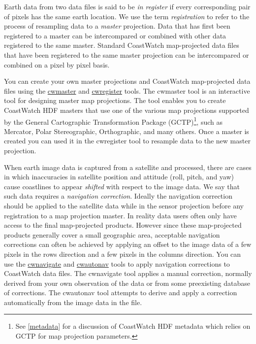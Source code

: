 Earth data from two data files is said to be {\em in register} if
every corresponding pair of pixels has the same earth location.  We
use the term {\em registration} to refer to the process of resampling
data to a {\em master} projection.  Data that has first been
registered to a master can be intercompared or combined with
other data registered to the same master.  Standard CoastWatch
map-projected data files that have been registered to the same master
projection can be intercompared or combined on a pixel by pixel basis.

You can create your own master projections and CoastWatch map-projected
data files using the \hyperlink{cwmaster}{cwmaster} and
\hyperlink{cwregister}{cwregister} tools.  The cwmaster tool is an
interactive tool for designing master map projections.  The tool
enables you to create CoastWatch HDF masters that use one of the
various map projections supported by the General Cartographic
Transformation Package (GCTP)\footnote{See \autoref{metadata} for
a discussion of CoastWatch HDF metadata which relies on GCTP for
map projection parameters.}, such as Mercator, Polar Stereographic,
Orthographic, and many others.  Once a master is created 
you can used it in the cwregister tool to resample data to the new
master projection.

When earth image data is captured from a satellite and processed,
there are cases in which inaccuracies in satellite position and
attitude (roll, pitch, and yaw) cause coastlines to appear {\em
shifted} with respect to the image data.  We say that such data
requires a {\em navigation correction}.  Ideally the navigation
correction should be applied to the satellite data while in the
sensor projection before any registration to a map projection master.
In reality data users often only have access to the final map-projected
products.  However since these map-projected products generally
cover a small geographic area, acceptable navigation corrections
can often be achieved by applying an offset to the image data of a
few pixels in the rows direction and a few pixels in the columns
direction.  You can use the \hyperlink{cwnavigate}{cwnavigate} and
\hyperlink{cwautonav}{cwautonav} tools to apply navigation corrections
to CoastWatch data files.  The cwnavigate tool applies a manual
correction, normally derived from your own observation of the data
or from some preexisting database of corrections.  The cwautonav
tool attempts to derive and apply a correction automatically from
the image data in the file.

